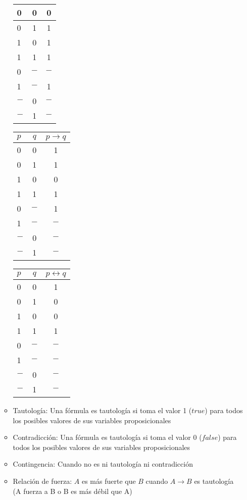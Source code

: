 \documentclass[a4paper,10pt]{article}
\begin{document}
\begin{itemize}
\begin{itemize}
\begin{center}
\begin{tabular}{| l | c | c | }
     				0 & 0 & 0 \\ \hline
     				0 & 1 & 1 \\ \hline
     				1 & 0 & 1 \\ \hline
     				1 & 1 & 1 \\ \hline
     				0 & $-$ & $-$ \\ \hline
     				1 & $-$ & 1 \\ \hline
     				$-$ & 0 & $-$ \\ \hline
     				$-$ & 1 & $-$ \\ 
     				\hline
   				\end{tabular}
   				\begin{tabular}{| l | c | c | }
     				\hline
     				$p$ & $q$ & $p \rightarrow q$ \\ \hline
     				0 & 0 & 1 \\ \hline
     				0 & 1 & 1 \\ \hline
     				1 & 0 & 0 \\ \hline
     				1 & 1 & 1 \\ \hline
     				0 & $-$ & 1 \\ \hline
     				1 & $-$ & $-$ \\ \hline
     				$-$ & 0 & $-$ \\ \hline
     				$-$ & 1 & $-$ \\ 
     				\hline
   				\end{tabular}
   				\begin{tabular}{| l | c | c | }
     				\hline
     				$p$ & $q$ & $p \leftrightarrow q$ \\ \hline
     				0 & 0 & 1 \\ \hline
     				0 & 1 & 0 \\ \hline
     				1 & 0 & 0 \\ \hline
     				1 & 1 & 1 \\ \hline
     				0 & $-$ & $-$ \\ \hline
     				1 & $-$ & $-$ \\ \hline
     				$-$ & 0 & $-$ \\ \hline
     				$-$ & 1 & $-$ \\ 
     				\hline
   				\end{tabular}
 			\end{center}
 			\item Tautología: Una fórmula es tautología si toma el valor 1 ($true$) para todos los posibles valores de sus variables proposicionales
 			\item Contradicción: Una fórmula es tautología si toma el valor 0 ($false$) para todos los posibles valores de sus variables proposicionales
 			\item Contingencia: Cuando no es ni tautología ni contradicción
 			\item Relación de fuerza: $A$ es más fuerte que $B$ cuando $A \rightarrow B$ es tautología (A fuerza a B o B es más débil que A)
		\end{itemize}
	\end{itemize}
\end{document}
